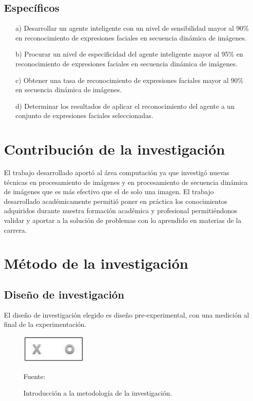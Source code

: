 \subsection{Específicos}
\begin{enumerate}
\item[a)] Desarrollar un agente inteligente con un nivel de sensibilidad mayor al 90\% en reconocimiento de expresiones faciales en secuencia dinámica de imágenes.

\item[b)] Procurar  un nivel de especificidad del agente inteligente mayor al 95\% en reconocimiento de expresiones faciales en secuencia dinámica de imágenes.

\item[c)] Obtener una tasa de reconocimiento de expresiones faciales mayor al 90\% en secuencia dinámica de imágenes.

\item[d)] Determinar los resultados de aplicar el reconocimiento del agente a un conjunto de expresiones faciales seleccionadas.
\end{enumerate}

\section{Contribución de la investigación}

El trabajo desarrollado aportó al área computación ya que investigó nuevas técnicas en procesamiento de imágenes y en procesamiento de secuencia dinámica de imágenes que es más efectivo que el de solo una imagen. 
\vskip 0.3cm
El trabajo desarrollado académicamente permitió poner en práctica los conocimientos adquiridos durante nuestra formación académica y profesional permitiéndonos validar y aportar a la solución de problemas con lo aprendido en materias de la carrera.

\section{Método de la investigación}

\subsection{Diseño de investigación}
El diseño de investigación elegido es diseño pre-experimental, con una medición al final de la experimentación.

\begin{figure}[ht]
\begin{center}
\includegraphics[width=0.3\textwidth]{Imagen1}
\end{center}
\begin{center}
\vskip -0.5cm
\caption{\small{Introducción a la metodología de la investigación.}}
{\small{Fuente: \cite{Bernal}}}
\end{center}
\end{figure}

